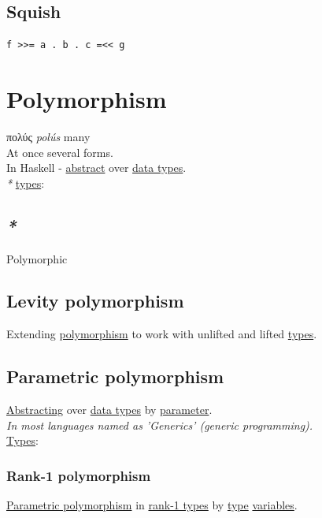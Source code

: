 \documentclass[a4paper,14pt,oneside]{book}
\begin{document}
\section{\label{org7bd4082}Squish}
\label{sec:org4ac1119}
\begin{verbatim}
f >>= a . b . c =<< g
\end{verbatim}

\chapter{\label{org56e5e45}Polymorphism}
\label{sec:org30ca132}
πολύς \emph{polús} many\\

At once several forms.\\

In Haskell - \hyperref[org939195a]{abstract} over \hyperref[orgd636563]{data types}.\\

\emph{*} \hyperref[org47bd1c4]{types}:\\

\section{\emph{*}}
\label{sec:orgc8cce34}

\label{orga6475c9}Polymorphic\\

\section{\label{orgca5ef56}Levity polymorphism}
\label{sec:orgc4de165}
Extending \hyperref[org56e5e45]{polymorphism} to work with unlifted and lifted \hyperref[org47bd1c4]{types}.\\

\section{\label{org1f920ac}Parametric polymorphism}
\label{sec:org847c4fe}
\hyperref[org3a3c3da]{Abstracting} over \hyperref[orgd636563]{data types} by \hyperref[orgd362766]{parameter}.\\

\emph{In most languages named as 'Generics' (generic programming).}\\

\hyperref[org47bd1c4]{Types}:\\

\subsection{\label{org13b4feb}Rank-1 polymorphism}
\label{sec:org73e0bff}
\hyperref[org1f920ac]{Parametric polymorphism} in \hyperref[org252c4dd]{rank-1 types} by \hyperref[org35b9249]{type} \hyperref[org0f938c0]{variables}.\\
\end{document}
